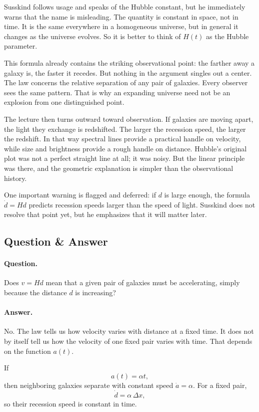 Susskind follows usage and speaks of the Hubble constant, but he immediately warns that the name is misleading. The quantity is constant in space, not in time. It is the same everywhere in a homogeneous universe, but in general it changes as the universe evolves. So it is better to think of \(H(t)\) as the Hubble parameter.

This formula already contains the striking observational point: the farther away a galaxy is, the faster it recedes. But nothing in the argument singles out a center. The law concerns the relative separation of any pair of galaxies. Every observer sees the same pattern. That is why an expanding universe need not be an explosion from one distinguished point.

The lecture then turns outward toward observation. If galaxies are moving apart, the light they exchange is redshifted. The larger the recession speed, the larger the redshift. In that way spectral lines provide a practical handle on velocity, while size and brightness provide a rough handle on distance. Hubble's original plot was not a perfect straight line at all; it was noisy. But the linear principle was there, and the geometric explanation is simpler than the observational history.

One important warning is flagged and deferred: if \(d\) is large enough, the formula \(\dot d = H d\) predicts recession speeds larger than the speed of light. Susskind does not resolve that point yet, but he emphasizes that it will matter later.

\subsection{Question \& Answer}

\paragraph{Question.} Does \(v=Hd\) mean that a given pair of galaxies must be accelerating, simply because the distance \(d\) is increasing?

\paragraph{Answer.} No. The law tells us how velocity varies with distance at a fixed time. It does not by itself tell us how the velocity of one fixed pair varies with time. That depends on the function \(a(t)\).

If
\begin{equation}
a(t)=\alpha t,
\end{equation}
then neighboring galaxies separate with constant speed \(\dot a=\alpha\). For a fixed pair,
\begin{equation}
\dot d = \alpha\,\Delta x,
\end{equation}
so their recession speed is constant in time.

